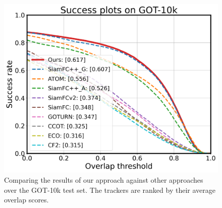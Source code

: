 \begin{figure}[t]
    \centering
    \includegraphics[width=1.0\textwidth]{Img/MTP/got10k/success_plot.png}
    \caption{Comparing the results of our approach against other approaches over the GOT-10k test set. The trackers are ranked by their average overlap scores.}
    \label{fig:got10k}
\end{figure}

